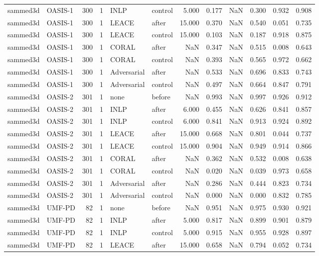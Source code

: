 \begin{tabular}{llrrllrrrrrr}
sammed3d & OASIS-1 & 300 & 1 & INLP & control & 5.000 & 0.177 & NaN & 0.300 & 0.932 & 0.908 \\
sammed3d & OASIS-1 & 300 & 1 & LEACE & after & 15.000 & 0.370 & NaN & 0.540 & 0.051 & 0.735 \\
sammed3d & OASIS-1 & 300 & 1 & LEACE & control & 15.000 & 0.103 & NaN & 0.187 & 0.918 & 0.875 \\
sammed3d & OASIS-1 & 300 & 1 & CORAL & after & NaN & 0.347 & NaN & 0.515 & 0.008 & 0.643 \\
sammed3d & OASIS-1 & 300 & 1 & CORAL & control & NaN & 0.393 & NaN & 0.565 & 0.972 & 0.662 \\
sammed3d & OASIS-1 & 300 & 1 & Adversarial & after & NaN & 0.533 & NaN & 0.696 & 0.833 & 0.743 \\
sammed3d & OASIS-1 & 300 & 1 & Adversarial & control & NaN & 0.497 & NaN & 0.664 & 0.847 & 0.791 \\
sammed3d & OASIS-2 & 301 & 1 & none & before & NaN & 0.993 & NaN & 0.997 & 0.926 & 0.912 \\
sammed3d & OASIS-2 & 301 & 1 & INLP & after & 6.000 & 0.455 & NaN & 0.626 & 0.841 & 0.857 \\
sammed3d & OASIS-2 & 301 & 1 & INLP & control & 6.000 & 0.841 & NaN & 0.913 & 0.924 & 0.892 \\
sammed3d & OASIS-2 & 301 & 1 & LEACE & after & 15.000 & 0.668 & NaN & 0.801 & 0.044 & 0.737 \\
sammed3d & OASIS-2 & 301 & 1 & LEACE & control & 15.000 & 0.904 & NaN & 0.949 & 0.914 & 0.866 \\
sammed3d & OASIS-2 & 301 & 1 & CORAL & after & NaN & 0.362 & NaN & 0.532 & 0.008 & 0.638 \\
sammed3d & OASIS-2 & 301 & 1 & CORAL & control & NaN & 0.020 & NaN & 0.039 & 0.973 & 0.658 \\
sammed3d & OASIS-2 & 301 & 1 & Adversarial & after & NaN & 0.286 & NaN & 0.444 & 0.823 & 0.734 \\
sammed3d & OASIS-2 & 301 & 1 & Adversarial & control & NaN & 0.000 & NaN & 0.000 & 0.832 & 0.785 \\
sammed3d & UMF-PD & 82 & 1 & none & before & NaN & 0.951 & NaN & 0.975 & 0.930 & 0.921 \\
sammed3d & UMF-PD & 82 & 1 & INLP & after & 5.000 & 0.817 & NaN & 0.899 & 0.901 & 0.879 \\
sammed3d & UMF-PD & 82 & 1 & INLP & control & 5.000 & 0.915 & NaN & 0.955 & 0.928 & 0.897 \\
sammed3d & UMF-PD & 82 & 1 & LEACE & after & 15.000 & 0.658 & NaN & 0.794 & 0.052 & 0.734 \\

\end{tabular}
